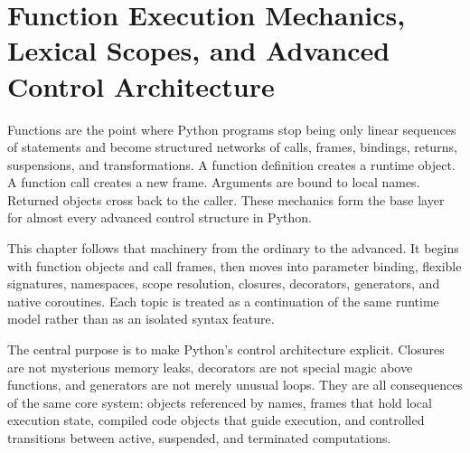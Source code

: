 \chapter{Function Execution Mechanics, Lexical Scopes, and Advanced Control Architecture}

Functions are the point where Python programs stop being only linear sequences of statements and become structured networks of calls, frames, bindings, returns, suspensions, and transformations. A function definition creates a runtime object. A function call creates a new frame. Arguments are bound to local names. Returned objects cross back to the caller. These mechanics form the base layer for almost every advanced control structure in Python.

This chapter follows that machinery from the ordinary to the advanced. It begins with function objects and call frames, then moves into parameter binding, flexible signatures, namespaces, scope resolution, closures, decorators, generators, and native coroutines. Each topic is treated as a continuation of the same runtime model rather than as an isolated syntax feature.

The central purpose is to make Python's control architecture explicit. Closures are not mysterious memory leaks, decorators are not special magic above functions, and generators are not merely unusual loops. They are all consequences of the same core system: objects referenced by names, frames that hold local execution state, compiled code objects that guide execution, and controlled transitions between active, suspended, and terminated computations.
